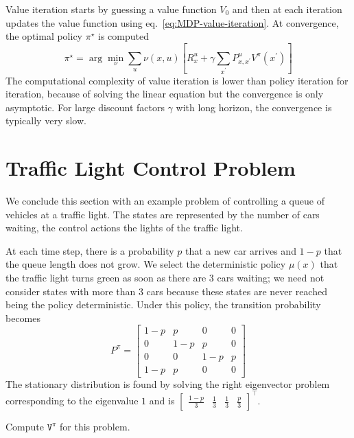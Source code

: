 Value iteration starts by guessing a value function $V_0$ and then at each iteration updates the value function using eq.~\eqref{eq:MDP-value-iteration}. At convergence, the optimal policy $\pi^\star$ is computed
\begin{equation*}
  \pi^\star = \arg \min_\nu \sum_u \nu(x,u)\left[R^u_x + \gamma \sum_{x^\prime}P^u_{x,x^\prime} V^\pi(x^\prime)\right]
\end{equation*}
The computational complexity of value iteration is lower than policy iteration for iteration, because of solving the linear equation but the convergence is only asymptotic. For large discount factors $\gamma$ with long horizon, the convergence is typically very slow.


\section{Traffic Light Control Problem}
\label{sec:MDP-traffic-light-control}

We conclude this section with an example problem of controlling a queue of vehicles at a traffic light. The states are represented by the number of cars waiting, the control actions the lights of the traffic light.

At each time step, there is a probability $p$ that a new car arrives and $1-p$ that the queue length does not grow. We select the deterministic policy $\mu(x)$ that the traffic light turns green as soon as there are 3 cars waiting; we need not consider states with more than 3 cars because these states are never reached being the policy deterministic. Under this policy, the transition probability becomes
\begin{equation*}
  P^\pi =
  \begin{bmatrix}
    1-p & p & 0 & 0 \\
    0 & 1-p & p & 0 \\
    0 & 0 & 1-p & p \\
    1-p & p & 0 & 0
  \end{bmatrix}
\end{equation*}
The stationary distribution is found by solving the right eigenvector problem corresponding to the eigenvalue $1$ and is $
\begin{bmatrix}
  \frac{1-p}{3} & \frac{1}{3} & \frac{1}{3} & \frac{p}{3}
\end{bmatrix}^\top$.

Compute $\mathtt{V}^\pi$ for this problem.

